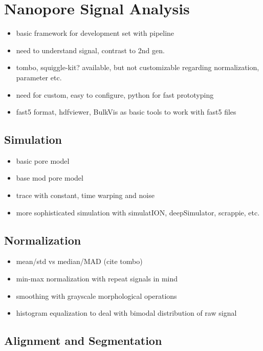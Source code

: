 \chapter{Nanopore Signal Analysis}
\label{cha:signal}

\begin{itemize}
	\item basic framework for development set with pipeline
	\item need to understand signal, contrast to 2nd gen.
	\item tombo, squiggle-kit? available, but not customizable regarding normalization, parameter etc.
	\item need for custom, easy to configure, python for fast prototyping
	\item fast5 format, hdfviewer, BulkVis as basic tools to work with fast5 files
\end{itemize}

\section{Simulation}
\label{sec:signal:simulation}

\begin{itemize}
    \item basic pore model
    \item base mod pore model
    \item trace with constant, time warping and noise
    \item more sophisticated simulation with simulatION, deepSimulator, scrappie, etc.
\end{itemize}


\section{Normalization}
\label{sec:signal:normalization}

\begin{itemize}
	\item mean/std vs median/MAD (cite tombo)
	\item min-max normalization with repeat signals in mind
	\item smoothing with grayscale morphological operations
	\item histogram equalization to deal with bimodal distribution of raw signal
\end{itemize}

\section{Alignment and Segmentation}
\label{sec:signal:alignment}

